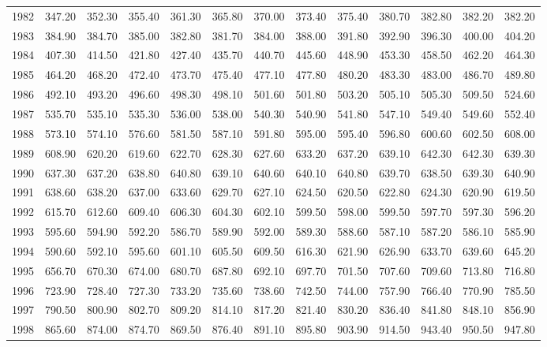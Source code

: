 \begin{longtable}{rrrrrrrrrrrrr}
  1982 & 347.20 & 352.30 & 355.40 & 361.30 & 365.80 & 370.00 & 373.40 & 375.40 & 380.70 & 382.80 & 382.20 & 382.20 \\ 
  1983 & 384.90 & 384.70 & 385.00 & 382.80 & 381.70 & 384.00 & 388.00 & 391.80 & 392.90 & 396.30 & 400.00 & 404.20 \\ 
  1984 & 407.30 & 414.50 & 421.80 & 427.40 & 435.70 & 440.70 & 445.60 & 448.90 & 453.30 & 458.50 & 462.20 & 464.30 \\ 
  1985 & 464.20 & 468.20 & 472.40 & 473.70 & 475.40 & 477.10 & 477.80 & 480.20 & 483.30 & 483.00 & 486.70 & 489.80 \\ 
  1986 & 492.10 & 493.20 & 496.60 & 498.30 & 498.10 & 501.60 & 501.80 & 503.20 & 505.10 & 505.30 & 509.50 & 524.60 \\ 
  1987 & 535.70 & 535.10 & 535.30 & 536.00 & 538.00 & 540.30 & 540.90 & 541.80 & 547.10 & 549.40 & 549.60 & 552.40 \\ 
  1988 & 573.10 & 574.10 & 576.60 & 581.50 & 587.10 & 591.80 & 595.00 & 595.40 & 596.80 & 600.60 & 602.50 & 608.00 \\ 
  1989 & 608.90 & 620.20 & 619.60 & 622.70 & 628.30 & 627.60 & 633.20 & 637.20 & 639.10 & 642.30 & 642.30 & 639.30 \\ 
  1990 & 637.30 & 637.20 & 638.80 & 640.80 & 639.10 & 640.60 & 640.10 & 640.80 & 639.70 & 638.50 & 639.30 & 640.90 \\ 
  1991 & 638.60 & 638.20 & 637.00 & 633.60 & 629.70 & 627.10 & 624.50 & 620.50 & 622.80 & 624.30 & 620.90 & 619.50 \\ 
  1992 & 615.70 & 612.60 & 609.40 & 606.30 & 604.30 & 602.10 & 599.50 & 598.00 & 599.50 & 597.70 & 597.30 & 596.20 \\ 
  1993 & 595.60 & 594.90 & 592.20 & 586.70 & 589.90 & 592.00 & 589.30 & 588.60 & 587.10 & 587.20 & 586.10 & 585.90 \\ 
  1994 & 590.60 & 592.10 & 595.60 & 601.10 & 605.50 & 609.50 & 616.30 & 621.90 & 626.90 & 633.70 & 639.60 & 645.20 \\ 
  1995 & 656.70 & 670.30 & 674.00 & 680.70 & 687.80 & 692.10 & 697.70 & 701.50 & 707.60 & 709.60 & 713.80 & 716.80 \\ 
  1996 & 723.90 & 728.40 & 727.30 & 733.20 & 735.60 & 738.60 & 742.50 & 744.00 & 757.90 & 766.40 & 770.90 & 785.50 \\ 
  1997 & 790.50 & 800.90 & 802.70 & 809.20 & 814.10 & 817.20 & 821.40 & 830.20 & 836.40 & 841.80 & 848.10 & 856.90 \\ 
  1998 & 865.60 & 874.00 & 874.70 & 869.50 & 876.40 & 891.10 & 895.80 & 903.90 & 914.50 & 943.40 & 950.50 & 947.80 \\ 

\end{longtable}
